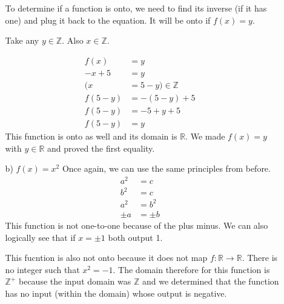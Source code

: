 \documentclass[letterpaper,11pt]{article}
\begin{document}
\begin{enumerate}
\begin{enumerate}
      To determine if a function is onto, we need to find its inverse (if it has one) and plug it back to the equation. It will be onto if $f(x) = y$.
      
      Take any $y \in \mathbb{Z}$. Also $x \in \mathbb{Z}$.

      \begin{equation}
        \begin{aligned}
          f(x) &= y &\\
          -x+5 &= y &\\
          (x &=5-y) \in \mathbb{Z}&\\
          f(5-y) &= -(5-y)+5 &\\
          f(5-y) &= -5+y+5 &\\
          f(5-y) &= y
        \end{aligned}
      \end{equation}
      This function is onto as well and its domain is $\mathbb{R}$. We made $f(x) = y$ with $y \in \mathbb{R}$ and proved the first equality. 
      \item [b)] $f(x) = x^2$ Once again, we can use the same principles from before.
      \begin{equation}
        \begin{aligned}
          a^2 &= c &\\
          b^2 &= c &\\
          a^2 &= b^2 &\\
          \pm a &= \pm b
        \end{aligned}
      \end{equation}
      This function is not one-to-one because of the plus minus. We can also logically see that if $x = \pm 1$ both output 1.
      
      This fucntion is also not onto because it does not map $f : \mathbb{R} \to \mathbb{R}$. There is no integer such that $x^2 = -1$.
      The domain therefore for this function is $\mathbb{Z^+}$ because the input domain was $\mathbb{Z}$ and we determined that the function has no input (within the domain) whose output is negative.
    
    \end{enumerate}
  \end{enumerate}
\end{document}
